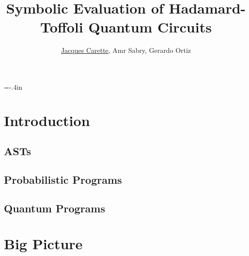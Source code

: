 \documentclass{beamer}
\title[\pgfuseimage{logo}] %
{Symbolic Evaluation of Hadamard-Toffoli Quantum Circuits}
\author[]{\underline{Jacques Carette}, Amr Sabry, Gerardo Ortiz}
\begin{document}
%

\hoffset=-.4in %
\begin{frame}[plain]

\titlepage

\end{frame}
\hoffset=0in %


\section[Introduction]{Introduction}

\subsection[ASTs]{ASTs}
\subsection[Probabilistic]{Probabilistic Programs}
\subsection[Quantum]{Quantum Programs}


\section[Big Picture]{Big Picture}
\end{document}
